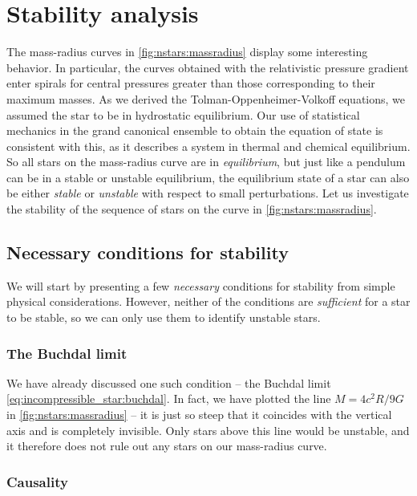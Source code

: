 \section{Stability analysis}

The mass-radius curves in \cref{fig:nstars:massradius} display some interesting behavior.
In particular, the curves obtained with the relativistic pressure gradient enter spirals for central pressures greater than those corresponding to their maximum masses.
As we derived the Tolman-Oppenheimer-Volkoff equations, we assumed the star to be in hydrostatic equilibrium.
Our use of statistical mechanics in the grand canonical ensemble to obtain the equation of state is consistent with this, as it describes a system in thermal and chemical equilibrium.
So all stars on the mass-radius curve are in \emph{equilibrium}, but just like a pendulum can be in a stable or unstable equilibrium, the equilibrium state of a star can also be either \emph{stable} or \emph{unstable} with respect to small perturbations.
Let us investigate the stability of the sequence of stars on the curve in \cref{fig:nstars:massradius}.

\subsection{Necessary conditions for stability}
\label{sec:nstars:stability_necessary}

We will start by presenting a few \emph{necessary} conditions for stability from simple physical considerations.
However, neither of the conditions are \emph{sufficient} for a star to be stable, so we can only use them to identify unstable stars.

\subsubsection{The Buchdal limit}

We have already discussed one such condition -- the Buchdal limit \eqref{eq:incompressible_star:buchdal}.
In fact, we have plotted the line $M = 4 c^2 R / 9 G$ in \cref{fig:nstars:massradius} -- it is just so steep that it coincides with the vertical axis and is completely invisible.
Only stars above this line would be unstable, and it therefore does not rule out any stars on our mass-radius curve.

\subsubsection{Causality}

